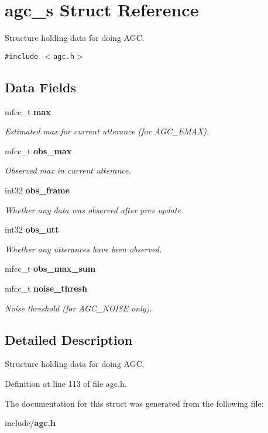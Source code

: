 \section{agc\_\-s Struct Reference}
\label{structagc__s}
Structure holding data for doing AGC.  


{\tt \#include $<$agc.h$>$}

\subsection*{Data Fields}
\begin{CompactItemize}
\item 
mfcc\_\-t {\bf max}\label{structagc__s_6a55c54c76a2e0373a907d186b89fa8e}

\begin{CompactList}\small\item\em Estimated max for current utterance (for AGC\_\-EMAX). \item\end{CompactList}\item 
mfcc\_\-t {\bf obs\_\-max}\label{structagc__s_20c5289a6328895101e89cc3b418a1e4}

\begin{CompactList}\small\item\em Observed max in current utterance. \item\end{CompactList}\item 
int32 {\bf obs\_\-frame}\label{structagc__s_5a6c2e967089085bd4f6020876bcb92a}

\begin{CompactList}\small\item\em Whether any data was observed after prev update. \item\end{CompactList}\item 
int32 {\bf obs\_\-utt}\label{structagc__s_e4ce95dcfb26c7f14ea316ac3ab202b2}

\begin{CompactList}\small\item\em Whether any utterances have been observed. \item\end{CompactList}\item 
mfcc\_\-t \textbf{obs\_\-max\_\-sum}\label{structagc__s_760e1204ad4a77903c99d549dfaff3ab}

\item 
mfcc\_\-t {\bf noise\_\-thresh}\label{structagc__s_4c896e65da00c79b77b23272474fcffc}

\begin{CompactList}\small\item\em Noise threshold (for AGC\_\-NOISE only). \item\end{CompactList}\end{CompactItemize}


\subsection{Detailed Description}
Structure holding data for doing AGC. 

Definition at line 113 of file agc.h.

The documentation for this struct was generated from the following file:\begin{CompactItemize}
\item 
include/{\bf agc.h}\end{CompactItemize}
